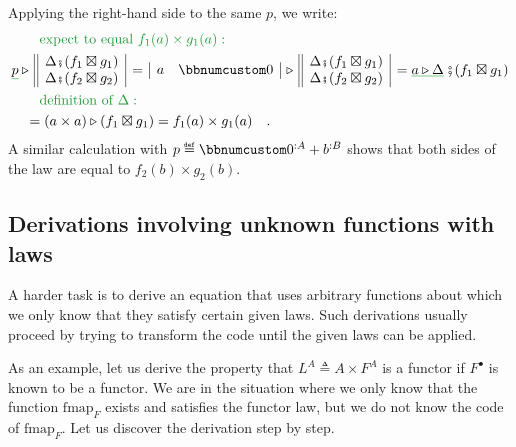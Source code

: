 Applying the right-hand side to the same $p$, we write:
\begin{align*}
 & \quad{\color{greenunder}\quad\text{expect to equal }f_{1}(a)\times g_{1}(a):}\quad\\
 & \gunderline p\triangleright\,\begin{array}{||c|}
\Delta\bef(f_{1}\boxtimes g_{1})\\
\Delta\bef(f_{2}\boxtimes g_{2})
\end{array}\,=\,\begin{array}{|cc|}
a & \bbnum 0\end{array}\,\triangleright\,\begin{array}{||c|}
\Delta\bef(f_{1}\boxtimes g_{1})\\
\Delta\bef(f_{2}\boxtimes g_{2})
\end{array}\,=\gunderline{a\triangleright\Delta}\,\bef(f_{1}\boxtimes g_{1})\\
 & \quad{\color{greenunder}\quad\text{definition of }\Delta:}\quad\\
 & \quad=(a\times a)\triangleright(f_{1}\boxtimes g_{1})=f_{1}(a)\times g_{1}(a)\quad.
\end{align*}
A similar calculation with $p\triangleq\bbnum 0^{:A}+b^{:B}$ shows
that both sides of the law are equal to $f_{2}(b)\times g_{2}(b)$.

\subsection{Derivations involving unknown functions with laws}

A harder task is to derive an equation that uses arbitrary functions
about which we only know that they satisfy certain given laws. Such
derivations usually proceed by trying to transform the code until
the given laws can be applied.

As an example, let us derive the property that $L^{A}\triangleq A\times F^{A}$
is a functor if $F^{\bullet}$ is known to be a functor. We are in
the situation where we only know that the function $\text{fmap}_{F}$
exists and satisfies the functor law, but we do not know the code
of $\text{fmap}_{F}$. Let us discover the derivation step by step.

